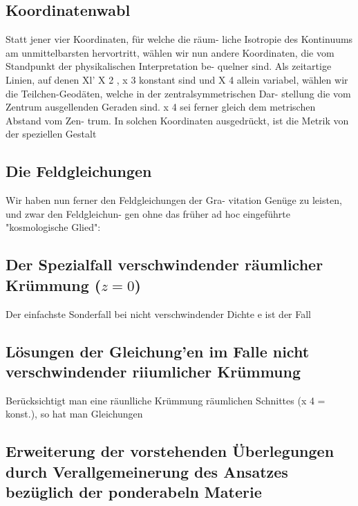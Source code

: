 \subsection{Koordinatenwabl}


Statt jener vier Koordinaten, für welche die räum-
liche Isotropie des Kontinuums am unmittelbarsten
hervortritt, wählen wir nun andere Koordinaten, die
vom Standpunkt der physikalischen Interpretation be-
quelner sind.
Als zeitartige Linien, auf denen Xl' X 2 , x 3 konstant
sind und X 4 allein variabel, wählen wir die Teilchen-Geodäten, welche in der zentralsymmetrischen Dar-
stellung die vom Zentrum ausgellenden Geraden sind.
x 4 sei ferner gleich dem metrischen Abstand vom Zen-
trum. In solchen Koordinaten ausgedrückt, ist die
Metrik von der speziellen Gestalt

\subsection{Die Feldgleichungen}


Wir haben nun ferner den Feldgleichungen der Gra-
vitation Genüge zu leisten, und zwar den Feldgleichun-
gen ohne das früher ad hoc eingeführte "kosmologische
Glied":

\subsection{Der Spezialfall verschwindender räumlicher
Krümmung ($z = 0$)}


Der einfachste Sonderfall bei nicht verschwindender
Dichte e ist der Fall

\subsection{Lösungen der Gleichung'en
im Falle nicht verschwindender riiumlicher Krümmung}


Berücksichtigt man eine räunlliche Krümmung
räumlichen Schnittes (x 4 = konst.), so hat man
Gleichungen

\subsection{Erweiterung der vorstehenden Überlegungen
durch Verallgemeinerung des Ansatzes bezüglich
der ponderabeln Materie}

